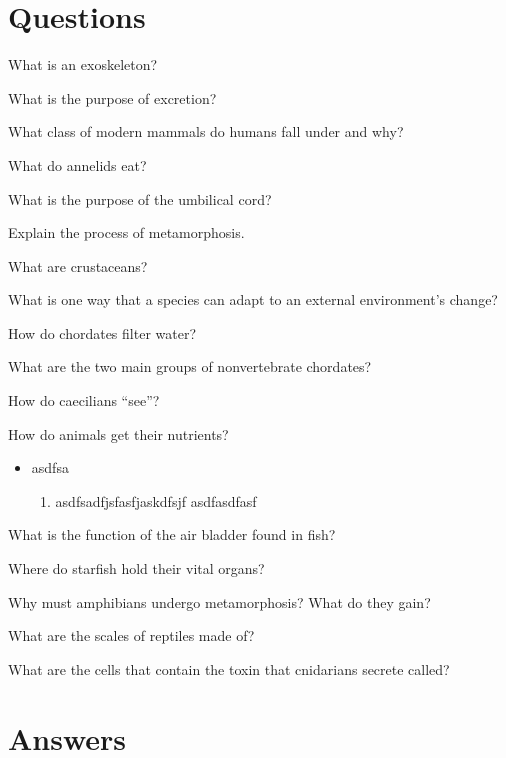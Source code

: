\documentclass[12pt]{article} %
\newcommand\blankpage{%
  \null
  \thispagestyle{empty}%
  \addtocounter{page}{-1}%
  \newpage}
\begin{document}
\section*{Questions}
  \begin{qstn}
    What is an exoskeleton?
  \end{qstn}
  \begin{qstn}
    What is the purpose of excretion?
  \end{qstn}
  \begin{qstn}
    What class of modern mammals do humans fall under and why?
  \end{qstn}
  \begin{qstn}
    What do annelids eat?
  \end{qstn}
  \begin{qstn}
    What is the purpose of the umbilical cord?
  \end{qstn}
  \begin{qstn}
    Explain the process of metamorphosis. 
  \end{qstn}
  \begin{qstn}
    What are crustaceans?
  \end{qstn}
  \begin{qstn}
    What is one way that a species can adapt to an external environment's change?
  \end{qstn}
  \begin{qstn}
    How do chordates filter water?
  \end{qstn}
  \begin{qstn}
    What are the two main groups of nonvertebrate chordates?
  \end{qstn}
  \begin{qstn}
    How do caecilians ``see''?
  \end{qstn}
  \begin{qstn}
    How do animals get their nutrients?
  \end{qstn}
  \begin{qstn}
    \begin{itemize}
      \item asdfsa
        \begin{enumerate}
          \item asdfsadfjsfasfjaskdfsjf
            asdfasdfasf
        \end{enumerate}
    \end{itemize}
  \end{qstn}
  \begin{qstn}
    What is the function of the air bladder found in fish?
  \end{qstn}
  \begin{qstn}
    Where do starfish hold their vital organs?
  \end{qstn}
  \begin{qstn}
    Why must amphibians undergo metamorphosis? What do they gain?
  \end{qstn}
  \begin{qstn}
    What are the scales of reptiles made of?
  \end{qstn}
  \begin{qstn}
    What are the cells that contain the toxin that cnidarians secrete called?
  \end{qstn}


  \newpage

  \section*{Answers}
  \afterpage{\blankpage}
  
\end{document}
